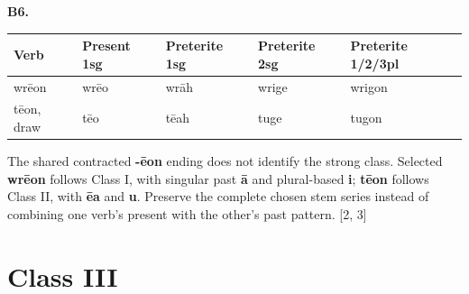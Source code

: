 \par\begin{minipage}{\linewidth}\raggedright
\textbf{B6.}

\par\begingroup
\fontsize{10.5}{13.2}\selectfont
\setlength{\LTleft}{0pt}\setlength{\LTright}{\fill}
\noindent
\begin{tabular}{@{}>{\raggedright\arraybackslash}p{20.8mm}>{\raggedright\arraybackslash}p{20.8mm}>{\raggedright\arraybackslash}p{22.47mm}>{\raggedright\arraybackslash}p{22.47mm}>{\raggedright\arraybackslash}p{26.21mm}@{}}
\toprule
\textbf{Verb} & \textbf{Present 1sg} & \textbf{Preterite 1sg} & \textbf{Preterite 2sg} & \textbf{Preterite 1/\allowbreak{}2/\allowbreak{}3pl} \\
\midrule
wrēon & wrēo & wrāh & wrige & wrigon \\
tēon, draw & tēo & tēah & tuge & tugon \\
\bottomrule
\end{tabular}
\par\endgroup

The shared contracted \textbf{-ēon} ending does not identify the strong class. Selected \textbf{wrēon} follows Class I, with singular past \textbf{ā} and plural-based \textbf{i}; \textbf{tēon} follows Class II, with \textbf{ēa} and \textbf{u}. Preserve the complete chosen stem series instead of combining one verb's present with the other's past pattern. [2, 3]

\end{minipage}\par\addvspace{4pt}

\section*{Class III}

